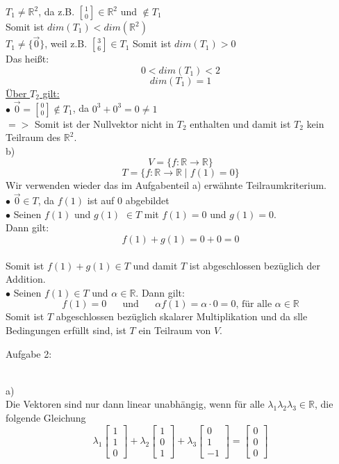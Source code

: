 \documentclass[11pt]{article}
\DeclareRobustCommand{\brkbinom}{\genfrac[]{0pt}{}}
\begin{document}
				$T_1\neq\mathbb{R}^2$, da z.B. $\brkbinom{1}{0} \in \mathbb{R}^2$ und $\notin T_1$\\
				Somit ist $dim(T_1)<dim(\mathbb{R}^2)$\\
				$T_1\neq\{\vec{0}\}$, weil z.B. $\brkbinom{3}{6} \in T_1$
				Somit ist $dim(T_1)>0$\\
				Das heißt:\\
				$$0<dim(T_1)<2$$
				$$dim(T_1)=1$$
				\underline{Über $T_2$ gilt:}\\
				\indent $\bullet$ $\vec{0}=\brkbinom{0}{0} \notin T_1$, da $0^3+0^3=0 \neq 1$\\
				$=>$ Somit ist der Nullvektor nicht in $T_2$ enthalten und damit ist $T_2$ kein Teilraum des $\mathbb{R}^2$.\\
			\indent b)\\
				$$V=\{f: \mathbb{R} \longrightarrow \mathbb{R}\}$$
				$$T=\{f: \mathbb{R} \longrightarrow \mathbb{R} \mid f(1)=0\}$$
				Wir verwenden wieder das im Aufgabenteil a) erwähnte Teilraumkriterium.\\
				\indent $\bullet$ $\vec{0} \in T$, da $f(1)$ ist auf $0$ abgebildet\\
				\indent $\bullet$ Seinen $f(1)$ und $g(1)$ $\in T$ mit $f(1)=0$ und $g(1)=0$.\\
				Dann gilt: $$f(1)+g(1)= 0+0=0$$\\
				Somit ist $f(1)+g(1) \in T$ und damit $T$ ist abgeschlossen bezüglich der Addition.\\
				\indent $\bullet$ Seinen $f(1) \in T$ und $\alpha \in \mathbb{R}$. Dann gilt:\\
				$$f(1)=0 \hspace{20pt} \text{und} \hspace{20pt} \alpha f(1)= \alpha \cdot 0 = 0 \text{, für alle } \alpha \in \mathbb{R}$$
				Somit ist $T$ abgeschlossen bezüglich skalarer Multiplikation und da slle Bedingungen erfüllt sind, ist $T$ ein Teilraum von $V$.\\
		\noindent \begin{Large}Aufgabe 2:\end{Large}\\[2pt]
			\indent a)\\
				Die Vektoren sind nur dann linear unabhängig, wenn für alle $\lambda_1 \lambda_2 \lambda_3 \in \mathbb{R}$, die folgende Gleichung\\
				$$\lambda_1 \begin{bmatrix}1\\1\\0\end{bmatrix} +
				\lambda_2 \begin{bmatrix}1\\0\\1\end{bmatrix} +
				\lambda_3 \begin{bmatrix}0\\1\\-1\end{bmatrix} = \begin{bmatrix}0\\0\\0\end{bmatrix}$$
\end{document}
